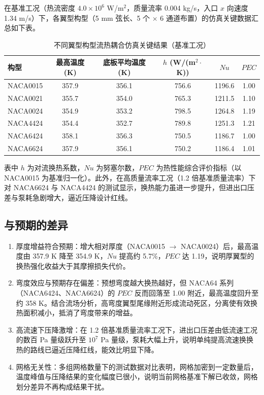 \documentclass[stage2]{ydzjreport}
\begin{document}
在基准工况（热流密度 $4.0\times10^{6}$ W/m$^2$，质量流率 0.004 kg/s，入口 $x$ 向速度 1.34 m/s）下，各翼型构型（5 mm 弦长、5 个 $\times$ 6 通道布置）的仿真关键数据汇总如下表。

\begin{table}[htbp]
\centering
\caption{不同翼型构型流热耦合仿真关键结果（基准工况）}
\begin{tabularx}{\textwidth}{@{}l c c c c c@{}}
\toprule
\rowcolor{ydzjlight} 构型 & 最高温度 (K) & 底板平均温度 (K) & $h$ (W/(m$^2\cdot$K)) & $Nu$ & $PEC$ \\
\midrule
NACA0015 & 357.9 & 356.1 & 756.6 & 1196.6 & 1.00 \\
NACA0021 & 355.7 & 354.0 & 765.3 & 1211.5 & 1.10 \\
NACA0024 & 354.9 & 353.2 & 798.5 & 1264.8 & 1.19 \\
NACA4424 & 354.4 & 352.7 & 789.8 & 1251.3 & 1.21 \\
NACA6424 & 358.1 & 356.3 & 750.5 & 1186.7 & 1.00 \\
NACA6624 & 357.9 & 356.1 & 750.2 & 1186.4 & 1.01 \\
\bottomrule
\end{tabularx}
\end{table}

表中 $h$ 为对流换热系数，$Nu$ 为努塞尔数，$PEC$ 为热性能综合评价指标（以 NACA0015 为基准归一化）。此外，在高质量流率工况（1.2 倍基准质量流率）下对 NACA6624 与 NACA4424 的测试显示，换热能力虽进一步提升，但进出口压差与泵耗急剧增大，逼近压降设计红线。

\subsection{与预期的差异}

\begin{enumerate}
  \item 厚度增益符合预期：增大相对厚度（NACA0015 $\rightarrow$ NACA0024）后，最高温度由 357.9 K 降至 354.9 K，$Nu$ 提高约 5.7\%，$PEC$ 达 1.19，说明厚翼型的换热强化收益大于其摩擦损失代价。
  \item 弯度效应与预期存在偏差：预想弯度越大换热越好，但 NACA64 系列（NACA6424、NACA6624）的 $PEC$ 反而回落至 1.00 附近，最高温度回升至约 358 K。结合流场分析，高弯度翼型尾缘附近形成流动死区，分离使有效换热面积减小，抵消了弯度带来的增益。
  \item 高流速下压降激增：在 1.2 倍基准质量流率工况下，进出口压差由低流速工况的数百 Pa 量级跃升至 $10^{7}$ Pa 量级，泵耗大幅上升，说明单纯提高流速换换热的路线已逼近压降红线，能效比明显下降。
  \item 网格无关性：多组网格数量下的测试数据对比表明，网格加密到一定数量后，温度峰值与压降结果的变化幅度已很小，说明当前网格基准下解已收敛，网格划分差异不再构成结果干扰。
\end{enumerate}
\end{document}
